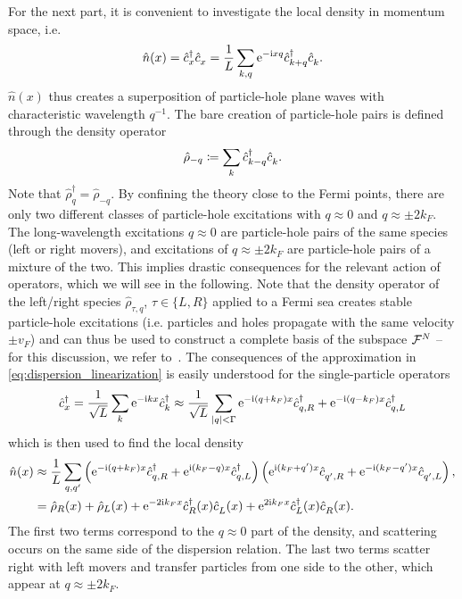 For the next part, it is convenient to investigate the local density in momentum space, i.e.
\begin{align}
    \hat n(x) = \hat c^\dag_x \hat c^\pdag_x = \frac1L\sum_{k,q}\re^{-\ri x q}\hat c^\dag_{k+q}\hat c^\pdag_{k}.
    \label{eq:local_density}
\end{align}
$\hat n(x)$ thus creates a superposition of particle-hole plane waves with characteristic wavelength $q^{-1}$.
The bare creation of particle-hole pairs is defined through the density operator
\begin{align}
    \hat \rho_{-q}\coloneqq \sum_k \hat c^\dag_{k-q}\hat c^\pdag_{k}.
\end{align}
Note that $\hat\rho_q^\dag = \hat\rho_{-q}$.
By confining the theory close to the Fermi points, there are only two different classes of particle-hole excitations with $q\approx 0$ and $q\approx\pm2k_F$.
The long-wavelength excitations $q\approx0$ are particle-hole pairs of the same species (left or right movers), and excitations of $q\approx\pm2k_F$ are particle-hole pairs of a mixture of the two.
This implies drastic consequences for the relevant action of operators, which we will see in the following.
Note that the density operator of the left/right species $\hat\rho_{\tau,q}$, $\tau\in\{L,R\}$ applied to a Fermi sea creates stable particle-hole excitations (i.e. particles and holes propagate with the same velocity $\pm v_F$) and can thus be used to construct a complete basis of the subspace $\mathcal{F}^N$ -- for this discussion, we refer to~\cite{vonDelft1998}.
The consequences of the approximation in \cref{eq:dispersion_linearization} is easily understood for the single-particle operators
\begin{align}
    \hat c^\dag_x = \frac1{\sqrt L}\sum_k \mathrm e^{-\mathrm i k x}\hat c^\dag_k \approx \frac1{\sqrt L}\sum_{|q|<\Gamma}\mathrm e^{-\mathrm i (q+k_F) x}\hat c^\dag_{q,R} + \mathrm e^{-\mathrm i (q-k_F) x}\hat c^\dag_{q,L}
    \label{eq:confinement_creation_annihilation}
\end{align}
which is then used to find the local density
\begin{align}
    \hat n(x)
    &\approx \frac1L\sum_{q,q'}\brlr{\re^{-\ri (q+k_F) x}\hat c^\dag_{q,R} + \re^{\ri (k_F-q) x}\hat c^\dag_{q,L}}\brlr{\re^{\ri (k_F+q') x}\hat c^\pdag_{q',R} + \re^{-\ri (k_F-q') x}\hat c^\pdag_{q',L}},
    \\
    &= \hat \rho_R(x) + \hat \rho_L(x) + \re^{-2\ri k_Fx}\hat c^\dag_{R}(x)\hat c^\pdag_{L}(x) + \re^{2\ri k_Fx}\hat c^\dag_{L}(x)\hat c^\pdag_{R}(x).
    \label{eq:local_density_approximation}
\end{align}
The first two terms correspond to the $q\approx0$ part of the density, and scattering occurs on the same side of the dispersion relation.
The last two terms scatter right with left movers and transfer particles from one side to the other, which appear at $q\approx\pm2k_F$.


